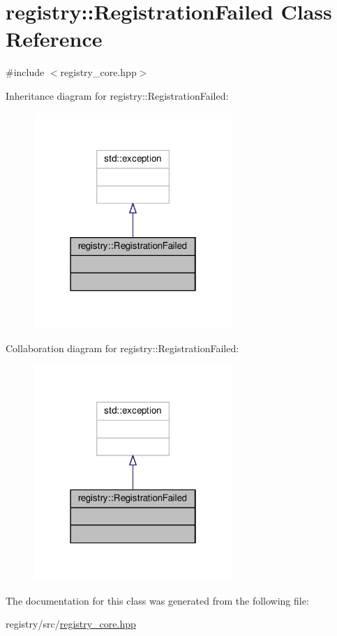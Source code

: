\hypertarget{classregistry_1_1RegistrationFailed}{}\section{registry\+:\+:Registration\+Failed Class Reference}
\label{classregistry_1_1RegistrationFailed}


{\ttfamily \#include $<$registry\+\_\+core.\+hpp$>$}



Inheritance diagram for registry\+:\+:Registration\+Failed\+:\nopagebreak
\begin{figure}[H]
\begin{center}
\leavevmode
\includegraphics[width=214pt]{classregistry_1_1RegistrationFailed__inherit__graph}
\end{center}
\end{figure}


Collaboration diagram for registry\+:\+:Registration\+Failed\+:\nopagebreak
\begin{figure}[H]
\begin{center}
\leavevmode
\includegraphics[width=214pt]{classregistry_1_1RegistrationFailed__coll__graph}
\end{center}
\end{figure}


The documentation for this class was generated from the following file\+:\begin{DoxyCompactItemize}
\item 
registry/src/\hyperlink{registry__core_8hpp}{registry\+\_\+core.\+hpp}\end{DoxyCompactItemize}
